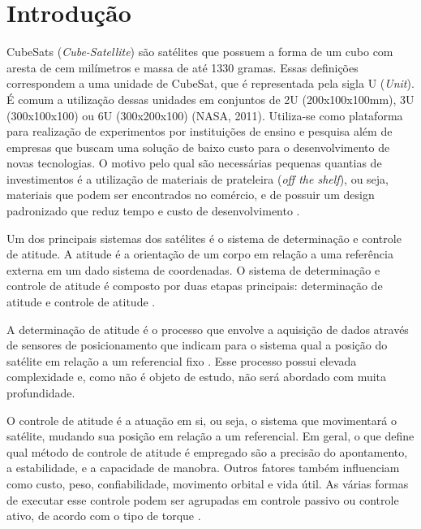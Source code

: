 \documentclass[
	12pt,				%
	openany,			%
	twoside,			%
	a4paper,			%
	english,			%
	french,				%
	spanish,			%
	brazil,				%
	oldfontcommands
	]{abntex2}
\begin{document}
\textual

\chapter[Introdução]{Introdução}

CubeSats (\textit{Cube-Satellite}) são satélites que possuem a forma de um cubo com aresta de cem milímetros e massa de até 1330 gramas. Essas definições correspondem a uma unidade de CubeSat, que é representada pela sigla U (\textit{Unit}). É comum a utilização dessas unidades em conjuntos de 2U (200x100x100mm), 3U (300x100x100) ou 6U (300x200x100) (NASA, 2011). Utiliza-se como plataforma para realização de experimentos por instituições de ensino e pesquisa além de empresas que buscam uma solução de baixo custo para o desenvolvimento de novas tecnologias. O motivo pelo qual são necessárias pequenas quantias de investimentos é a utilização de materiais de prateleira (\textit{off the shelf}), ou seja, materiais que podem ser encontrados no comércio, e de possuir um design padronizado que reduz tempo e custo de desenvolvimento \cite{CalPoly}.

Um dos principais sistemas dos satélites é o sistema de determinação e controle de atitude. A atitude é a orientação de um corpo em relação a uma referência externa em um dado sistema de coordenadas. O sistema de determinação e controle de atitude é composto por duas etapas principais: determinação de atitude e controle de atitude \cite{FrancLav}.

A determinação de atitude é o processo que envolve a aquisição de dados através de sensores de posicionamento que indicam para o sistema qual a posição do satélite em relação a um referencial fixo \cite{FrancLav}. Esse processo possui elevada complexidade e, como não é objeto de estudo, não será abordado com muita profundidade.

O controle de atitude é a atuação em si, ou seja, o sistema que movimentará o satélite, mudando sua posição em relação a um referencial. Em geral, o que define qual método de controle de atitude é empregado são a precisão do apontamento, a estabilidade, e a capacidade de manobra. Outros fatores também influenciam como custo, peso, confiabilidade, movimento orbital e vida útil. As várias formas de executar esse controle podem ser agrupadas em controle passivo ou controle ativo, de acordo com o tipo de torque \cite{FrancLav}.
\end{document}
